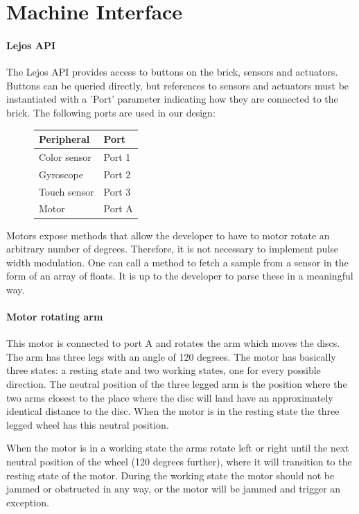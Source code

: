 \documentclass[a4paper,oneside,11pt]{article}
\begin{document}
\section{Machine Interface}
\paragraph{Lejos API}
The Lejos API provides access to buttons on the brick, sensors and actuators. Buttons can be queried directly, but references to sensors and actuators must be instantiated with a 'Port' parameter indicating how they are connected to the brick. The following ports are used in our design:

\begin{figure}[H]
\begin{tabular}{|l|l|}
\hline
\textbf{Peripheral} & \textbf{Port} \\
\hline
Color sensor & Port 1 \\
Gyroscope & Port 2 \\
Touch sensor & Port 3 \\
Motor & Port A \\
\hline
\end{tabular}
\end{figure}

Motors expose methods that allow the developer to have to motor rotate an arbitrary number of degrees. Therefore, it is not necessary to implement pulse width modulation. One can call a method to fetch a sample from a sensor in the form of an array of floats. It is up to the developer to parse these in a meaningful way.

\paragraph{Motor rotating arm}
This motor is connected to port A and rotates the arm which moves the discs. The arm has three legs with an angle of 120 degrees. The motor has basically three states: a resting state and two working states, one for every possible direction. The neutral position of the three legged arm is the position where the two arms closest to the place where the disc will land have an approximately identical distance to the disc. When the motor is in the resting state the three legged wheel has this neutral position.

When the motor is in a working state the arms rotate left or right until the next neutral position of the wheel (120 degrees further), where it will transition to the resting state of the motor. During the working state the motor should not be jammed or obstructed in any way, or the motor will be jammed and trigger an exception.
\end{document}
